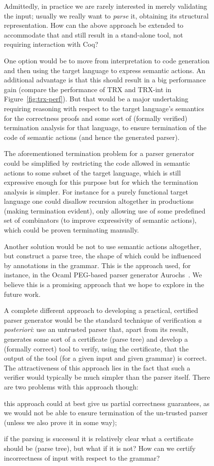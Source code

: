 \documentclass{LMCS}
\theoremstyle{definition}
\begin{document}
\begin{figure}[t!]
\begin{center}
Admittedly, in practice we are rarely interested in merely validating the input;
usually we really want to \textit{parse} it, obtaining its structural representation.
How can the above approach be extended to accommodate that and still result in a
stand-alone tool, not requiring interaction with Coq?

One option would be to move from interpretation to code generation and then using 
the target language to express semantic actions. An additional advantage is that this
should result in a big performance gain (compare the performance of TRX and TRX-int in 
Figure~\ref{fig:trx-perf}). But that would be a major undertaking requiring 
reasoning with respect to the target language's semantics for the correctness proofs
and some sort of (formally verified) termination analysis for that language, to 
ensure termination of the code of semantic actions (and hence the generated parser). 

The aforementioned termination problem for a parser generator could be simplified 
by restricting the code allowed in semantic actions to some subset of the target 
language, which is still expressive enough for this purpose but for which the termination 
analysis is simpler. For instance for a purely functional target language one could
disallow recursion altogether in productions (making termination evident), only allowing 
use of some predefined set of combinators (to improve expressivity of semantic actions), 
which could be proven terminating manually.

Another solution would be not to use semantic actions altogether, but construct a
parse tree, the shape of which could be influenced by annotations in the grammar.
This is the approach used, for instance, in the Ocaml PEG-based parser generator
Aurochs~\cite{aurochs}. We believe this is a promising approach that we hope
to explore in the future work.

\bigskip
A complete different approach to developing a practical, certified parser generator
would be the standard technique of verification \emph{a posteriori}: use an untrusted
parser that, apart from its result, generates some sort of a certificate (parse tree)
and develop a (formally correct) tool to verify, using the certificate, that the output
of the tool (for a given input and given grammar) is correct. The attractiveness of this
approach lies in the fact that such a verifier would typically be much
simpler than the parser itself. There are two problems with this approach though:
\begin{iteMize}{}
 \item this approach could at best give us partial correctness guarantees, as we
   would not be able to ensure termination of the un-trusted parser (unless we
   also prove it in some way);
 \item if the parsing is successul it is relatively clear what a certificate should be
   (parse tree), but what if it is not? How can we certify incorrectness of input
   with respect to the grammar?
\end{iteMize}


\end{center}
\end{figure}
\end{document}

